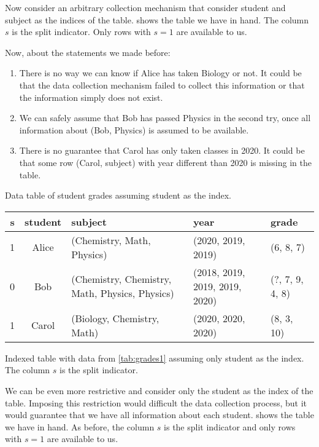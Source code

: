 Now consider an arbitrary collection mechanism that consider student and subject as the
indices of the table.   shows the table we have in hand.  The column $s$
is the split indicator.  Only rows with $s = 1$ are available to us.

Now, about the statements we made before:
\begin{enumerate}
  \itemsep0em
  \item There is no way we can know if Alice has taken Biology or not.  It could be that
    the data collection mechanism failed to collect this information or that the
    information simply does not exist.
  \item We can safely assume that Bob has passed Physics in the second try, once all
    information about (Bob, Physics) is assumed to be available.
  \item There is no guarantee that Carol has only taken classes in 2020.  It could be that
    some row (Carol, subject) with year different than 2020 is missing in the table.
\end{enumerate}

\begin{tablebox}[label=tab:grades3]{Data table of student grades assuming student as the index.}
  \centering
  \begin{tabular}{ccp{2.6cm}p{1.8cm}>{\raggedright\arraybackslash}p{1.2cm}}
    \toprule
    \textbf{s} & \textbf{student} & \textbf{subject} & \textbf{year} & \textbf{grade} \\
    \midrule
    1 & Alice & (Chemistry, Math, Physics) & (2020, 2019, 2019) & (6, 8, 7) \\
    0 & Bob & (Chemistry, Chemistry, Math, Physics, Physics) & (2018, 2019, 2019, 2019, 2020) & (?, 7, 9, 4, 8) \\
    1 & Carol & (Biology, Chemistry, Math) & (2020, 2020, 2020) & (8, 3, 10) \\
    \bottomrule
  \end{tabular}
  \tcblower
  Indexed table with data from \cref{tab:grades1} assuming only student
  as the index.  The column $s$ is the split indicator.
\end{tablebox}

We can be even more restrictive and consider only the student as the index of the table.
Imposing this restriction would difficult the data collection process, but it would
guarantee that we have all information about each student.   shows the
table we have in hand.  As before, the column $s$ is the split indicator and only rows with
$s = 1$ are available to us.

